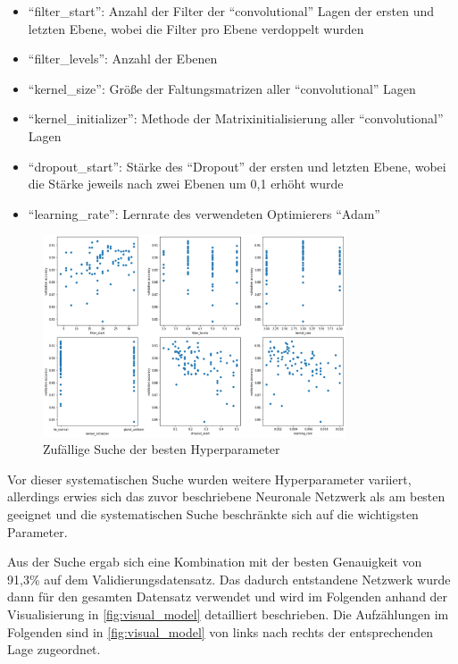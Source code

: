 \begin{itemize}
    \item \enquote{filter\_start}: Anzahl der Filter der \enquote{convolutional} Lagen der ersten und letzten Ebene, wobei die Filter pro Ebene verdoppelt wurden
    \item \enquote{filter\_levels}: Anzahl der Ebenen
    \item \enquote{kernel\_size}: Größe der Faltungsmatrizen aller \enquote{convolutional} Lagen
    \item \enquote{kernel\_initializer}: Methode der Matrixinitialisierung aller \enquote{convolutional} Lagen
    \item \enquote{dropout\_start}: Stärke des \enquote{Dropout} der ersten und letzten Ebene, wobei die Stärke jeweils nach zwei Ebenen um 0,1 erhöht wurde
    \item \enquote{learning\_rate}: Lernrate des verwendeten Optimierers \enquote{Adam}
\end{itemize}

\begin{figure}
    \centering
    \includegraphics[width=0.8\textwidth]{images/grid_search.png}
    \caption{Zufällige Suche der besten Hyperparameter}
    \label{fig:grid_search}
\end{figure}

Vor dieser systematischen Suche wurden weitere Hyperparameter variiert, allerdings erwies sich das zuvor beschriebene Neuronale Netzwerk als am besten geeignet
und die systematischen Suche beschränkte sich auf die wichtigsten Parameter.

Aus der Suche ergab sich eine Kombination mit der besten Genauigkeit von 91,3\% auf dem Validierungsdatensatz.
Das dadurch entstandene Netzwerk wurde dann für den gesamten Datensatz verwendet und wird im Folgenden anhand der Visualisierung in \autoref{fig:visual_model} detailliert beschrieben.
Die Aufzählungen im Folgenden sind in \autoref{fig:visual_model} von links nach rechts der entsprechenden Lage zugeordnet.

